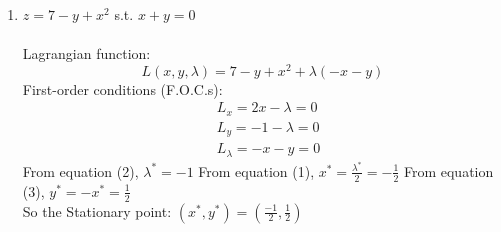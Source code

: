 \documentclass{./../../Latex/homework}
\begin{document}
\begin{enumerate}
\begin{enumerate}
\item $z=7-y+x^{2}$ s.t. $x+y=0$ \\~\\
Lagrangian function:
$$ L(x, y, \lambda)=7-y+x^{2}+\lambda(-x-y) $$
\setcounter{equation}{0}
First-order conditions (F.O.C.s):
\begin{align}
&L_{x}=2 x-\lambda=0 \\
&L_{y}=-1-\lambda=0 \\
&L_{\lambda}=-x-y=0
\end{align}
From equation (2), $\lambda^{*}=-1$
From equation (1), $x^{*}=\frac{\lambda^{*}}{2}=-\frac{1}{2}$
From equation (3), $y^{*}=-x^{*}=\frac{1}{2}$ \\
So the Stationary point: $\left(x^{*}, y^{*}\right)=\left(\frac{-1}{2}, \frac{1}{2}\right)$ \\~\\
\end{enumerate}


\end{enumerate}
\end{document}
